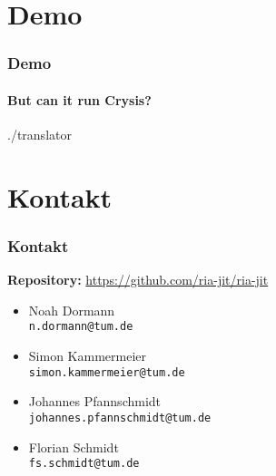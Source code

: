 \documentclass[aspectratio=169, sectionpage=false, german]{tumbeamer}
\newcommand{\blueverb}[1]{{\color{TUMBlue} \texttt{#1}}}
\begin{document}
\section{Demo}
\begin{frame}[c]
	\frametitle{Demo}
	\framesubtitle{But can it run Crysis?}
	\centering\Huge\ttfamily
	./translator
\end{frame}


\section{Kontakt}
\begin{frame}[c]
	\frametitle{Kontakt}
	\textbf{Repository:}\hspace{0.25cm} {\color{TUMBlue}\url{https://github.com/ria-jit/ria-jit}}
	
	\vspace{0.75cm}
	
	\begin{itemize}
		\item Noah Dormann\\\blueverb{n.dormann@tum.de}
		\item Simon Kammermeier\\\blueverb{simon.kammermeier@tum.de}
		\item Johannes Pfannschmidt\\\blueverb{johannes.pfannschmidt@tum.de}
		\item Florian Schmidt\\\blueverb{fs.schmidt@tum.de}
	\end{itemize}
\end{frame}
\end{document}
